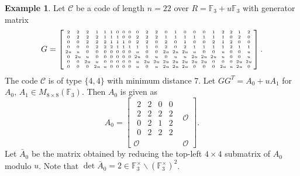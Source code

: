 \documentclass{article}
\theoremstyle{definition}
\newtheorem{example}{Example}[section]
\theoremstyle{remark}
\begin{document}
\begin{example}\label{odd-nonsquare}
    Let $\mathcal{C}$ be a code of length $n=22$ over $R=\mathbb{F}_3+u\mathbb{F}_3$ with generator matrix
    \[
    \begingroup
    \setlength{\arraycolsep}{2pt}
    \tiny
    G=
    \left[
    \begin{array}{cccccccccccccccccccccc}
    2&2&2&1&1&1&0&0&0&0&2&2&0&1&0&0&0&1&2&2&1&2\\
    0&2&2&2&1&1&1&0&0&2&2&2&1&1&1&1&1&1&1&0&2&0\\
    0&0&2&2&2&1&1&1&0&2&2&0&2&0&1&0&0&2&1&2&0&0\\
    0&0&0&2&2&2&1&1&1&1&1&0&2&0&2&1&1&1&1&2&1&1\\
    2u&u&0&0&0&0&0&0&0&u&0&0&2u&2u&2u&u&0&0&u&0&0&u\\
    0&2u&u&0&0&0&0&0&0&2u&0&u&0&u&u&2u&2u&2u&u&0&0&u\\
    0&0&2u&u&0&0&0&0&0&u&2u&2u&2u&2u&2u&2u&2u&0&0&0&2u&2u\\
    0&0&0&2u&u&0&0&0&0&u&0&u&2u&2u&2u&0&0&0&2u&u&2u&0
    \end{array}
    \right].
    \endgroup
    \]
    The code $\mathcal{C}$ is of type $\{4, 4\}$ with minimum distance 7. Let $GG^T=A_0+uA_1$ for $A_0,\,A_1\in M_{8\times 8}(\mathbb{F}_3)$. Then $A_0$ is given as
    \[
    A_0=\left[
    \begin{array}{c|c}
        \begin{matrix}
           2 & 2 & 0 & 0\\
           2 & 2 & 2 & 2\\
           0 & 2 & 1 & 2\\
           0 & 2 & 2 & 2
        \end{matrix} & \mathcal{O}\\\hline
        \mathcal{O} & \mathcal{O}
    \end{array}
    \right].
    \]
    Let $\bar{A}_0$ be the matrix obtained by reducing the top-left $4\times 4$ submatrix of $A_0$ modulo $u$. Note that $\det\bar{A}_0=2\in \mathbb{F}_3^\times\backslash(\mathbb{F}_3^\times)^2$.
    

\end{example}
\end{document}
